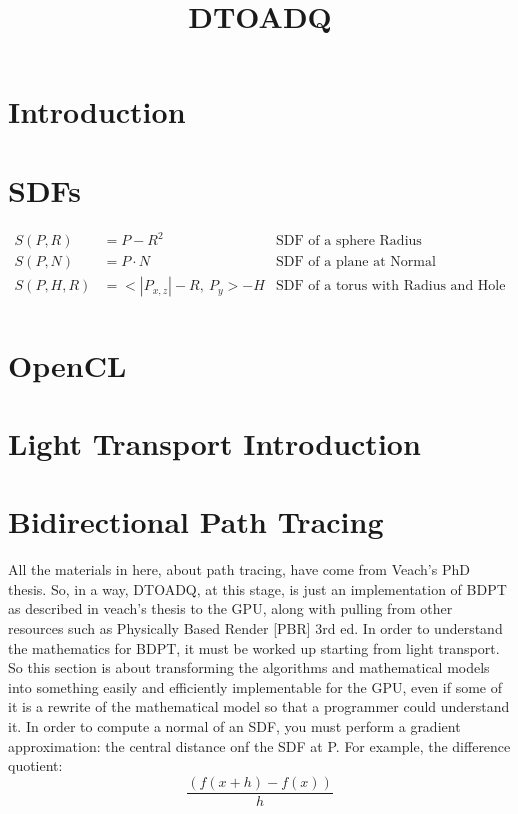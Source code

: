\documentclass{article}
\title{DTOADQ}
\begin{document}
  \maketitle
  \section{Introduction}

  \section{SDFs}
  \begin{align*}
    S(P, R) &= P - R^2   & \text{SDF of a sphere Radius  }\\
    S(P, N) &= P \cdot N  & \text{SDF of a plane at Normal}\\
    S(P, H, R) &= <|P_{x, z}| - R, \: P_{y}> - H & \text{SDF of a torus with
                                                  Radius and Hole}\\
  \end{align*}
  \section{OpenCL}
  \section{Light Transport Introduction}
  \section{Bidirectional Path Tracing}
    All the materials in here, about path tracing, have come from Veach's PhD
    thesis. So, in a way, DTOADQ, at this stage, is just an implementation of
    BDPT as described in veach's thesis to the GPU, along with pulling from
    other resources such as Physically Based Render [PBR] 3rd ed. In order
    to understand the mathematics for BDPT, it must be worked up starting from
    light transport. So this section is about transforming the algorithms and
    mathematical models into something easily and efficiently implementable for
    the GPU, even if some of it is a rewrite of the mathematical model so that a
    programmer could understand it. In order to compute a normal of an SDF, you
    must perform a gradient approximation: the central distance onf the SDF at
    P. For example, the difference quotient:
      \[\frac{(f(x+h) - f(x))}{h}\]
\end{document}
